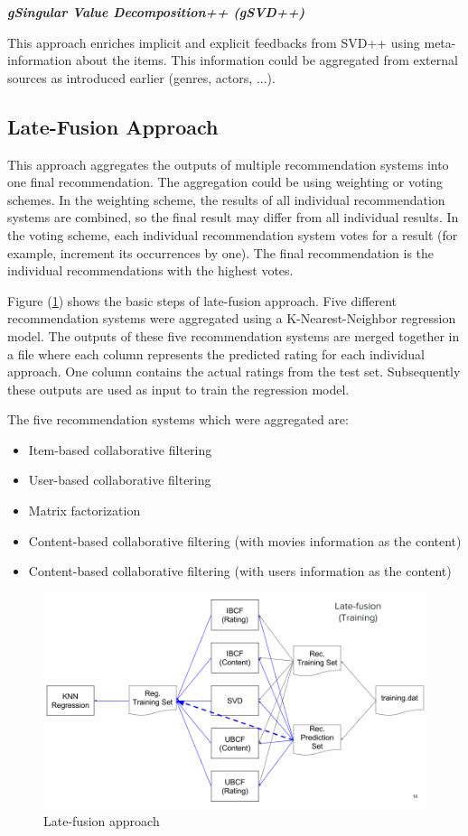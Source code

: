 \documentclass{sigish}
\begin{document}
\textbf{\emph{gSingular Value Decomposition++ (gSVD++) }}

This approach enriches implicit and explicit feedbacks from SVD++ using meta-information about the items. This information could be aggregated from external sources as introduced earlier (genres, actors, ...).

\subsection{Late-Fusion Approach}

This approach aggregates the outputs of multiple recommendation systems into one final recommendation. The aggregation could be using weighting or voting schemes. In the weighting scheme, the results of all individual recommendation systems are combined, so the final result may differ from all individual results. In the voting scheme, each individual recommendation system votes for a result (for example, increment its occurrences by one). The final recommendation is the individual recommendations with the highest votes.

Figure (\ref{fig:late_fusion_approach}) shows the basic steps of late-fusion approach. Five different recommendation systems were aggregated using a K-Nearest-Neighbor regression model. The outputs of these five recommendation systems are merged together in a file where each column represents the predicted rating for each individual approach. One column contains the actual ratings from the test set. Subsequently these outputs are used as input to train the regression model. 

The five recommendation systems which were aggregated are:
\begin{itemize}
	\item Item-based collaborative filtering
	\item User-based collaborative filtering
	\item Matrix factorization
	\item Content-based collaborative filtering (with movies information as the content)
	\item Content-based collaborative filtering (with users information as the content)
\end{itemize}

\begin{figure}
	\centering
	\includegraphics[width=\columnwidth]{images/late_fusion_approach.png}
	\caption{Late-fusion approach}
	\label{fig:late_fusion_approach}
\end{figure}
\end{document}
